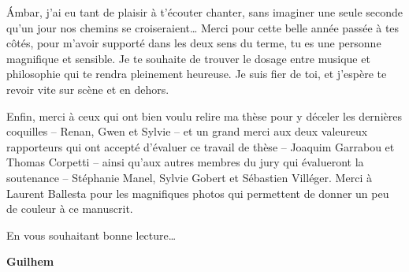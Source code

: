 Ámbar, j’ai eu tant de plaisir à t’écouter chanter, sans imaginer une seule seconde qu’un jour nos chemins se croiseraient… Merci pour cette belle année passée à tes côtés, pour m'avoir supporté dans les deux sens du terme, tu es une personne magnifique et sensible. Je te souhaite de trouver le dosage entre musique et philosophie qui te rendra pleinement heureuse. Je suis fier de toi, et j'espère te revoir vite sur scène et en dehors.

Enfin, merci à ceux qui ont bien voulu relire ma thèse pour y déceler les dernières coquilles –  Renan, Gwen et Sylvie – et un grand merci aux deux valeureux rapporteurs qui ont accepté d’évaluer ce travail de thèse – Joaquim Garrabou et Thomas Corpetti – ainsi qu’aux autres membres du jury qui évalueront la soutenance – Stéphanie Manel, Sylvie Gobert et Sébastien Villéger. Merci à Laurent Ballesta pour les magnifiques photos qui permettent de donner un peu de couleur à ce manuscrit.

En vous souhaitant bonne lecture…



\vskip 0.3cm
\noindent
 \qquad  \qquad \qquad \qquad \qquad \qquad \qquad \qquad \quad \textbf{Guilhem}
